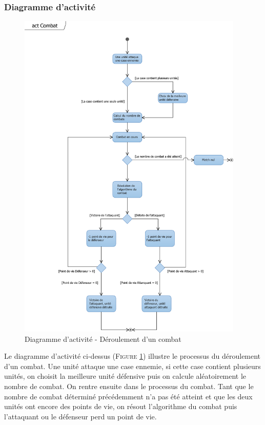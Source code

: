 \documentclass[a4paper,11pt]{article}
\begin{document}
		\subsubsection{Diagramme d'activité}
		\begin{figure}[ht!]
			\includegraphics[height=16cm]{Diagrammes/Combat/actCombat.png}
			\caption{Diagramme d'activité - Déroulement d'un combat}
			\label{fig:actcombat}
		\end{figure}
		\vspace*{1cm}
		Le diagramme d'activité ci-dessus (\textsc{Figure \ref{fig:actcombat}}) illustre le processus du déroulement d'un combat. Une unité attaque une case ennemie, si cette case contient plusieurs unités, on choisit la meilleure unité défensive puis on calcule aléatoirement le nombre de combat. On rentre ensuite dans le processus du combat. Tant que le nombre de combat déterminé précédemment n'a pas été atteint et que les deux unités ont encore des points de vie, on résout l'algorithme du combat puis l'attaquant ou le défenseur perd un point de vie.
		\newpage
\end{document}
